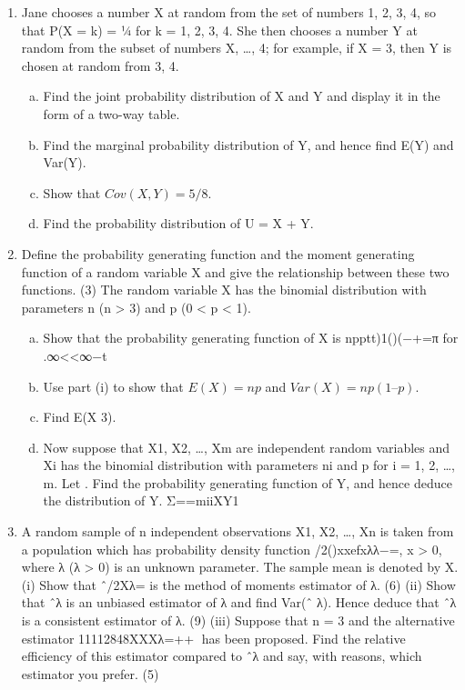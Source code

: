\begin{enumerate}
\item Jane chooses a number X at random from the set of numbers {1, 2, 3, 4}, so that
P(X = k) = ¼ for k = 1, 2, 3, 4.
She then chooses a number Y at random from the subset of numbers {X, …, 4}; for example, if X = 3, then Y is chosen at random from {3, 4}.
\begin{enumerate}[(a)]
\item Find the joint probability distribution of X and Y and display it in the form of a two-way table.
\item Find the marginal probability distribution of Y, and hence find E(Y) and Var(Y).
\item Show that $Cov(X, Y) = 5/8$.
\item Find the probability distribution of U = X + Y.
\end{enumerate}


\item  Define the probability generating function and the moment generating function of a random variable X and give the relationship between these two functions.
(3)
The random variable X has the binomial distribution with parameters n (n > 3) and p (0 < p < 1).
\begin{enumerate}[(a)]
\item  Show that the probability generating function of X is
npptt)1()(−+=π
for .∞<<∞−t
\item Use part (i) to show that $E(X) = np$ and $Var(X) = np(1 – p)$.
\item Find E(X 3).
\item Now suppose that X1, X2, …, Xm are independent random variables and Xi has the binomial distribution with parameters ni and p for i = 1, 2, …, m. Let . Find the probability generating function of Y, and hence deduce the distribution of Y. Σ==miiXY1
\end{enumerate}


\item  A random sample of n independent observations X1, X2, …, Xn is taken from a population which has probability density function /2()xxefxλλ−=, x > 0,
where λ (λ > 0) is an unknown parameter. The sample mean is denoted by X.
(i) Show that ˆ/2Xλ= is the method of moments estimator of λ.
(6)
(ii) Show that ˆλ is an unbiased estimator of λ and find Var(ˆ
λ). Hence deduce that ˆλ is a consistent estimator of λ.
(9)
(iii) Suppose that n = 3 and the alternative estimator 11112848XXXλ=++􀀄
has been proposed. Find the relative efficiency of this estimator compared to ˆλ
and say, with reasons, which estimator you prefer.
(5)


\end{enumerate}
